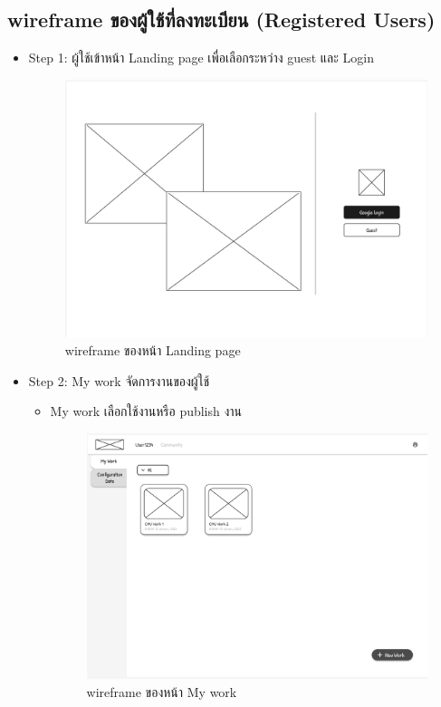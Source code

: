 \begin{mypara}
\begin{itemize}
\end{itemize} 


\subsection{wireframe ของผู้ใช้ที่ลงทะเบียน (Registered Users)}
\begin{itemize}
    \item Step 1: ผู้ใช้เข้าหน้า Landing page เพื่อเลือกระหว่าง guest และ Login
    \begin{figure}[H]
    \centering
    \includegraphics[scale=0.4]
    {homepage.png}
    \caption{wireframe ของหน้า Landing page}
    \label{fig:WireframeHomepageLogin}
    \end{figure}
    \item Step 2: My work จัดการงานของผู้ใช้
    \begin{itemize}
      \item My work เลือกใช้งานหรือ publish งาน
        \begin{figure}[H]
          \centering
          \includegraphics[scale=0.4]{my_work.png} 
          \caption{wireframe ของหน้า My work}
          \label{fig:WireframeMyWork}
        \end{figure}


\end{itemize}
\end{itemize}
\end{mypara}
